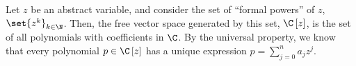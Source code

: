 \begin{example}
  Let $z$ be an abstract variable, and consider the set of ``formal powers'' of $z$, $\set{z^k}_{k\in\N}$. Then, the free vector space generated by this set, $\C\left[z\right]$, is the set of all polynomials with coefficients in $\C$. By the universal property, we know that every polynomial $p\in \C\left[z\right]$ has a unique expression $p = \sum_{j=0}^{n}a_jz^j$.
\end{example}
%
